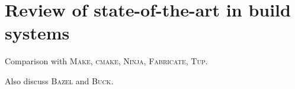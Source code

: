 \section{Review of state-of-the-art in build systems\label{section-review}}

Comparison with \textsc{Make}, \textsc{cmake}, \textsc{Ninja},
\textsc{Fabricate}, \textsc{Tup}.

Also discuss \textsc{Bazel} and \textsc{Buck}.
